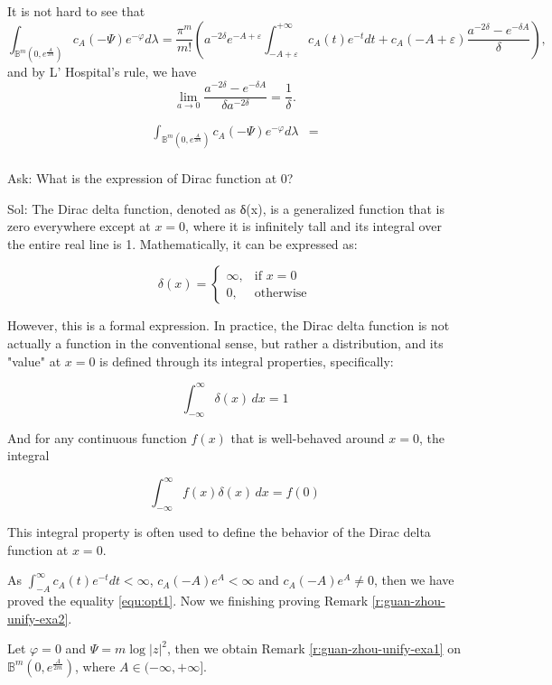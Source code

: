 It is not hard to see that
$$\int_{\mathbb{B}^{m}(0,{e^{\frac{A}{2m}}})}c_{A}(-\Psi)e^{-\varphi}d\lambda
=\frac{\pi^{m}}{m!}(a^{-2\delta}e^{-A+\varepsilon}\int_{-A+\varepsilon}^{+\infty}c_{A}(t)e^{-t}dt
+c_{A}(-A+\varepsilon)\frac{a^{-2\delta}-e^{-\delta A}}{\delta}),$$
and by L' Hospital's rule, we have 
$$\lim_{a\to0}\frac{a^{-2\delta}-e^{-\delta A}}{\delta a^{-2\delta}}=\frac{1}{\delta}.$$
\begin{tcolorbox}[colback=Emerald!10,colframe=cyan!40!black]
\begin{align*}
  \int_{\mathbb{B}^{m}(0,{e^{\frac{A}{2m}}})}c_{A}(-\Psi)e^{-\varphi}d\lambda
&=\\
\end{align*}
  
  \end{tcolorbox}

\begin{remark}
  Ask: What is the expression of Dirac function at $0$?

  Sol: The Dirac delta function, denoted as δ(x), is a generalized function that is zero everywhere except at \(x = 0\), where it is infinitely tall and its integral over the entire real line is 1. Mathematically, it can be expressed as:

  \[ \delta(x) = \begin{cases} \infty, & \text{if } x = 0 \\ 0, & \text{otherwise} \end{cases} \]
  
  However, this is a formal expression. In practice, the Dirac delta function is not actually a function in the conventional sense, but rather a distribution, and its "value" at \(x = 0\) is defined through its integral properties, specifically:
  
  \[ \int_{-\infty}^{\infty} \delta(x) \, dx = 1 \]
  
  And for any continuous function \(f(x)\) that is well-behaved around \(x = 0\), the integral
  
  \[ \int_{-\infty}^{\infty} f(x) \delta(x) \, dx = f(0) \]
  
  This integral property is often used to define the behavior of the Dirac delta function at \(x = 0\).
\end{remark}
As $\int_{-A}^{\infty}c_{A}(t)e^{-t}dt<\infty$,
$c_{A}(-A)e^{A}<\infty$ and $c_{A}(-A)e^{A}\neq0$, then we have
proved the equality \ref{equ:opt1}. Now we finishing proving Remark
\ref{r:guan-zhou-unify-exa2}.

Let $\varphi=0$ and $\Psi=m\log|z|^{2}$, then we obtain Remark
\ref{r:guan-zhou-unify-exa1} on
$\mathbb{B}^{m}(0,{e^{\frac{A}{2m}}})$, where
$A\in(-\infty,+\infty]$.

